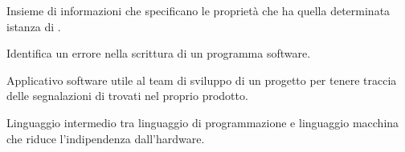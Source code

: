 Insieme di informazioni che specificano le proprietà  che ha quella determinata istanza di .

Identifica un errore nella scrittura di un programma software.

Applicativo software utile al team di sviluppo di un progetto per tenere traccia delle segnalazioni di  trovati nel proprio prodotto.
 
Linguaggio intermedio tra linguaggio di programmazione e linguaggio macchina che riduce l'indipendenza dall'hardware.
\clearpage